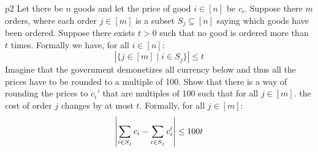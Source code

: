\documentclass[a4paper, 11pt]{article}
\begin{document}
\newpage
\begin{problem}{%
	}{p2%
	}
Let there be $n$ goods and let the price of good $i\in[n]$ be $c_i$. Suppose there $m$ orders, where each order $j\in[m]$ is a subset $S_j\subseteq [n]$ saying which goods have been ordered. Suppose there exists $t>0$ such that no good is ordered more than $t$ times. Formally we have, for all $i\in [n]$: $$|\{j\in[m]\mid i\in S_j\}|\leq t$$
	Imagine that the government demonetizes all currency below  and thus all the prices have to be rounded to a multiple of 100. Show that there is a way of rounding the prices to $c_i'$ that are multiples of 100 such that for all $j\in[m]$. the cost of order $j$ changes by at most $t$. Formally, for all $j\in[m]$: $$\left|\sum_{i\in S_j}c_i-\sum_{i\in S_j}c_i'\right|\leq 100t$$
\end{problem}
\end{document}
